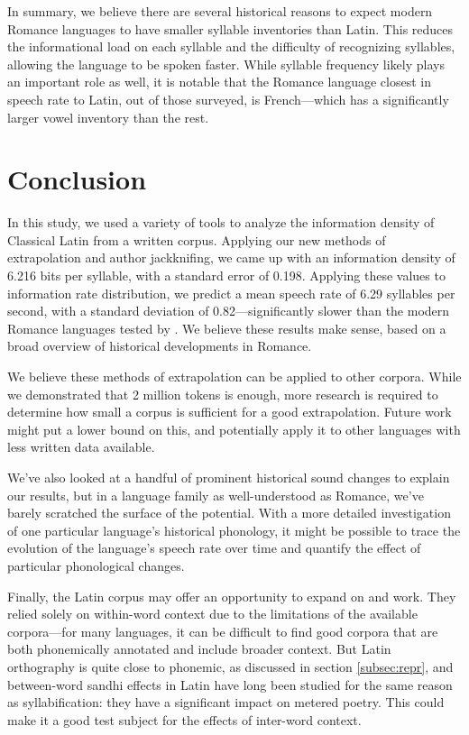 \documentclass[12pt,twoside]{article}
\begin{document}
In summary, we believe there are several historical reasons to expect modern Romance languages to have smaller syllable inventories than Latin. This reduces the informational load on each syllable and the difficulty of recognizing syllables, allowing the language to be spoken faster. While syllable frequency likely plays an important role as well, it is notable that the Romance language closest in speech rate to Latin, out of those surveyed, is French---which has a significantly larger vowel inventory than the rest.

\section{Conclusion}
\label{sec:concl}

In this study, we used a variety of tools to analyze the information density of Classical Latin from a written corpus. Applying our new methods of extrapolation and author jackknifing, we came up with an information density of 6.216 bits per syllable, with a standard error of 0.198. Applying these values to  information rate distribution, we predict a mean speech rate of 6.29 syllables per second, with a standard deviation of 0.82---significantly slower than the modern Romance languages tested by \citeauthor{coupé}. We believe these results make sense, based on a broad overview of historical developments in Romance.

We believe these methods of extrapolation can be applied to other corpora. While we demonstrated that 2 million tokens is enough, more research is required to determine how small a corpus is sufficient for a good extrapolation. Future work might put a lower bound on this, and potentially apply it to other languages with less written data available.

We've also looked at a handful of prominent historical sound changes to explain our results, but in a language family as well-understood as Romance, we've barely scratched the surface of the potential. With a more detailed investigation of one particular language's historical phonology, it might be possible to trace the evolution of the language's speech rate over time and quantify the effect of particular phonological changes.

Finally, the Latin corpus may offer an opportunity to expand on \citet{oh} and  work. They relied solely on within-word context due to the limitations of the available corpora---for many languages, it can be difficult to find good corpora that are both phonemically annotated and include broader context. But Latin orthography is quite close to phonemic, as discussed in section \ref{subsec:repr}, and between-word sandhi effects in Latin have long been studied for the same reason as syllabification: they have a significant impact on metered poetry. This could make it a good test subject for the effects of inter-word context.
\end{document}
